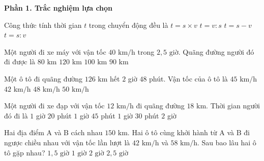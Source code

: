 \textbf{Phần 1. Trắc nghiệm lựa chọn}

\begin{ex} %
Công thức tính thời gian $t$ trong chuyển động đều là
\choice
{$t = s \times v$}
{$t = v : s$}
{$t = s - v$}
{\True $t = s : v$}
\end{ex}

\begin{ex} %
Một người đi xe máy với vận tốc $40\text{ km/h}$ trong $2{,}5\text{ giờ}$. Quãng đường người đó đi được là
\choice
{$80\text{ km}$}
{$120\text{ km}$}
{\True $100\text{ km}$}
{$90\text{ km}$}
\end{ex}

\begin{ex} %
Một ô tô đi quãng đường $126\text{ km}$ hết $2$ giờ $48$ phút. Vận tốc của ô tô là
\choice
{\True $45\text{ km/h}$}
{$42\text{ km/h}$}
{$48\text{ km/h}$}
{$50\text{ km/h}$}
\end{ex}

\begin{ex} %
Một người đi xe đạp với vận tốc $12\text{ km/h}$ đi quãng đường $18\text{ km}$. Thời gian người đó đi là
\choice
{$1$ giờ $20$ phút}
{$1$ giờ $45$ phút}
{\True $1$ giờ $30$ phút}
{$2$ giờ}
\end{ex}

\begin{ex} %
Hai địa điểm A và B cách nhau $150\text{ km}$. Hai ô tô cùng khởi hành từ A và B đi ngược chiều nhau với vận tốc lần lượt là $42\text{ km/h}$ và $58\text{ km/h}$. Sau bao lâu hai ô tô gặp nhau?
\choice
{\True $1{,}5\text{ giờ}$}
{$1\text{ giờ}$}
{$2\text{ giờ}$}
{$2{,}5\text{ giờ}$}
\end{ex}

